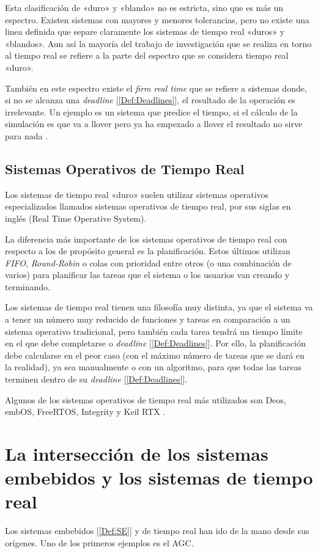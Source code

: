 Esta clasificación de «duro» y «blando» no es estricta, sino que es más un espectro. Existen sistemas con mayores y menores tolerancias, pero no existe una linea definida que separe claramente los sistemas de tiempo real «duros» y «blandos». Aun así la mayoría del trabajo de investigación que se realiza en torno al tiempo real se refiere a la parte del espectro que se considera tiempo real «duro».

También en este espectro existe el \emph{firm real time} que se refiere a sistemas donde, si no se alcanza una \emph{deadline} [\ref{Def:Deadlines}], el resultado de la operación es irrelevante. Un ejemplo es un sistema que predice el tiempo, si el cálculo de la simulación es que va a llover pero ya ha empezado a llover el resultado no sirve para nada \cite{wang2017rtes}.

\subsection{Sistemas Operativos de Tiempo Real}
Los sistemas de tiempo real «duro» suelen utilizar sistemas operativos especializados llamados sistemas operativos de tiempo real,  por sus siglas en inglés (Real Time Operative System).

La diferencia más importante de los sistemas operativos de tiempo real con respecto a los de propósito general es la planificación. Estos últimos utilizan \emph{FIFO}, \emph{Round-Robin} o colas con prioridad entre otros (o una combinación de varios) para planificar las tareas que el sistema o los usuarios van creando y terminando.

Los sistemas de tiempo real tienen una filosofía muy distinta, ya que el sistema va a tener un número muy reducido de funciones y tareas en comparación a un sistema operativo tradicional, pero también cada tarea tendrá un tiempo límite en el que debe completarse o \emph{deadline} [\ref{Def:Deadlines}]. Por ello, la planificación debe calcularse en el peor caso (con el máximo número de tareas que se dará en la realidad), ya sea manualmente o con un algoritmo, para que todas las tareas terminen dentro de su \emph{deadline} [\ref{Def:Deadlines}].

Algunos de los sistemas operativos de tiempo real más utilizados son Deos, embOS, FreeRTOS, Integrity y Keil RTX \cite{lynx2024rtos}.

\section{La intersección de los sistemas embebidos y los sistemas de tiempo real}
Los sistemas embebidos [\ref{Def:SE}] y de tiempo real han ido de la mano desde sus orígenes. Uno de los primeros ejemplos es el AGC.

